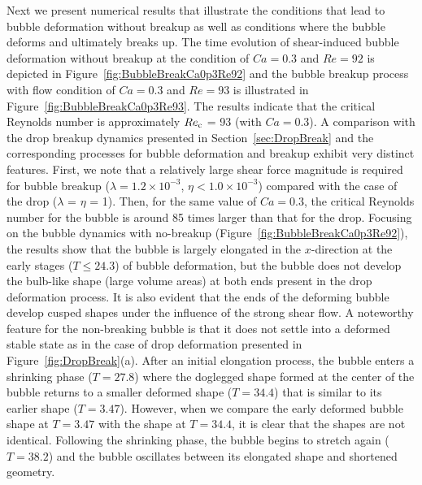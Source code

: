 \documentclass[%
 reprint,
 showkeys,
 amsmath,amssymb,
 aps,
 prfluids,
 onecolumn
]{revtex4-2}
\begin{document}
%
Next we present numerical results that illustrate the conditions that lead to
bubble deformation without breakup as well as conditions where the bubble
deforms and ultimately breaks up.  The time evolution of shear-induced bubble
deformation without breakup at the condition of $Ca=0.3$ and $Re=92$ is
depicted in Figure~\ref{fig:BubbleBreakCa0p3Re92} and the bubble breakup
process with flow condition of $Ca=0.3$ and $Re=93$ is illustrated in
Figure~\ref{fig:BubbleBreakCa0p3Re93}.  The results indicate that the critical
Reynolds number is approximately $Re_{\rm c}$ = 93 (with $Ca=0.3$).  A comparison
with the drop breakup dynamics presented in Section~\ref{sec:DropBreak} and the
corresponding processes for bubble deformation and breakup exhibit very
distinct features.  First, we note that a relatively large shear force
magnitude is required for bubble breakup 
($\lambda = 1.2 \times 10^{-3}$, $\eta < 1.0 \times 10^{-3}$) 
compared with the case of the drop ($\lambda$ = $\eta$ = 1). Then,
for the same value of $Ca=0.3$, the critical Reynolds number for the bubble is
around 85 times larger than that for the drop.  Focusing on the bubble dynamics
with no-breakup (Figure~\ref{fig:BubbleBreakCa0p3Re92}), the results show that
the bubble is largely elongated in the $x$-direction at the early stages ($T
\leq 24.3$) of bubble deformation, but the bubble does not develop the
bulb-like shape (large volume areas) at both ends present in the drop
deformation process.  It is also evident that the ends of the deforming bubble
develop cusped shapes under the influence of the strong shear flow.  A
noteworthy feature for the non-breaking bubble is that it does not settle into
a deformed stable state as in the case of drop deformation presented in
Figure~\ref{fig:DropBreak}(a).  After an initial elongation process, the bubble
enters a shrinking phase ($T = 27.8$) where the doglegged shape formed at the
center of the bubble returns to a smaller deformed shape ($T = 34.4$) that is
similar to its earlier shape ($T=3.47$).  However, when we compare the early
deformed bubble shape at $T = 3.47$ with the shape at $T = 34.4$, it is clear
that the shapes are not identical.  Following the shrinking phase, the bubble
begins to stretch again ($T = 38.2$) and the bubble oscillates between its
elongated shape and shortened geometry.  
\end{document}
